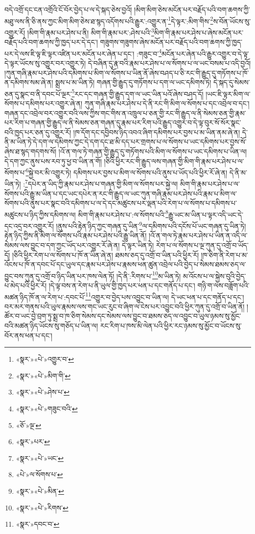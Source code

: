 བདེ་འགྲོ་དང་ངན་འགྲོའི་ངོ་བོར་བྱེད་པ་ལ་དེ་སྐད་ཅེས་བྱའོ། །མིག་མིག་ཅེས་མངོན་པར་བརྗོད་པའི་བག་ཆགས་ཀྱི་མཐུ་ལས་ནི་ཅི་ནས་ཀྱང་མིག་མིག་ཅེས་ཐ་སྙད་འདོགས་པའི་རྒྱུར་:འགྱུར་ན་\footnote{«སྣར་»«པེ་»འགྱུར་བ་}དེ་ལྟར་:མིག་གིས་\footnote{«སྣར་»«པེ་»མིག་གི་}ས་བོན་ཡོངས་སུ་འགྱུར་རོ། །མིག་གི་རྣམ་པར་ཤེས་པ་ནི། མིག་གི་རྣམ་པར་:ཤེས་པའི་\footnote{«སྣར་»«པེ་»ཤེས་པ་}མིག་གི་རྣམ་པར་ཤེས་པ་ཞེས་མངོན་པར་བརྗོད་པའི་བག་ཆགས་ཀྱི་ཁྱད་པར་དེ་དང་། གཟུགས་གཟུགས་ཞེས་མངོན་པར་བརྗོད་པའི་བག་ཆགས་ཀྱི་ཁྱད་པར་དེ་ལས་ཇི་ལྟ་ཇི་ལྟར་འཛིན་པར་མངོན་པར་ཞེན་པ་དང་། :གཟུང་བ་\footnote{«སྣར་»«པེ་»གཟུང་བའི་}མངོན་པར་ཞེན་པའི་རྒྱུར་འགྱུར་བ་དེ་ལྟ་དེ་ལྟར་ཡོངས་སུ་འགྱུར་བར་འགྱུར་ཏེ། དེ་བཞིན་དུ་རྣ་བའི་རྣམ་པར་ཤེས་པ་ལ་སོགས་པ་ལ་ཡང་བསམ་པ་འདི་བྱའོ། །ཀུན་གཞི་རྣམ་པར་ཤེས་པའི་དམིགས་པ་མིག་ལ་སོགས་པ་ཡིན་ནོ་ཞེས་བཤད་པ་ཅི་རང་གི་རྒྱུད་དུ་གཏོགས་པ་ཁོ་ན་དམིགས་སམ་ཞེ་ན། སྨྲས་པ་མ་ཡིན་ཏེ། གཞན་གྱི་རྒྱུད་དུ་གཏོགས་པ་དག་ལ་ཡང་དམིགས་ཏེ། དེ་སྐད་དུ་སེམས་ཅན་དུ་སྣང་བ་ནི་དབང་པོ་ལྔར་\footnote{«ཅོ་»ལྔ་}རང་དང་གཞན་གྱི་རྒྱུད་དག་ལ་ཡང་ཡིན་པའོ་ཞེས་བཤད་དོ། །ཡང་ཇི་ལྟར་མིག་ལ་སོགས་པ་དམིགས་པར་འགྱུར་ཞེ་ན། ཀུན་གཞི་རྣམ་པར་ཤེས་པ་དེ་ནི་རང་གི་མིག་ལ་སོགས་པ་དང་འབྲེལ་བ་དང་། གཞན་དང་འབྲེལ་བར་འགྱུར་བའི་ལས་ཀྱིས་གང་གིས་ན་འཁྲུལ་པ་ཅན་གྱི་རང་གི་རྒྱུད་ལ་ནི་སེམས་ཅན་གྱི་རྣམ་པར་རིག་པ་གཞན་གྱི་རྒྱུད་ལ་ནི་སེམས་ཅན་གཞན་དུ་རྣམ་པར་རིག་པའི་རྒྱུད་འགྱུར་བ་དེ་ལྟ་བུར་སོ་སོར་སྣང་བའི་ཁྱད་པར་ཅན་དུ་འགྱུར་རོ། །ཁ་དོག་དང་དབྱིབས་ཉིད་འབའ་ཞིག་དམིགས་པར་བྱས་པ་མ་ཡིན་ནམ་ཞེ་ན། དེ་ནི་མ་ཡིན་ཏེ་དེ་དག་ལ་དམིགས་ཀྱང་དེ་དག་དང་ཐ་མི་དད་པར་གྲགས་པ་ལ་སོགས་པ་ཡང་དམིགས་པར་བྱས་སོ་ཞེས་ཐ་སྙད་གདགས་སོ། །འོ་ན་གལ་ཏེ་གཞན་གྱི་རྒྱུད་དུ་གཏོགས་པའི་མིག་ལ་སོགས་པ་ཡང་དམིགས་པ་ཡིན་ལ། དེ་དག་ཀྱང་ནུས་པས་རབ་ཏུ་ཕྱ་བ་ཡིན་ན་གོ། །ཅིའི་ཕྱིར་རང་གི་རྒྱུད་ལས་གཞན་གྱི་མིག་གི་རྣམ་པར་ཤེས་པ་ལ་སོགས་པ་\footnote{«སྣར་»པར་}སྐྱེ་བར་མི་འགྱུར་ཏེ། དམིགས་པར་བྱས་པ་མིག་ལ་སོགས་པའི་ནུས་པ་ཡོད་པའི་ཕྱིར་རོ་ཞེ་ན། དེ་ནི་མ་ཡིན་ཏེ། :\footnote{«སྣར་»«པེ་»ཡང་}དཔེར་ན་ཡིད་ཀྱི་རྣམ་པར་ཤེས་པ་གཞན་གྱི་མིག་ལ་སོགས་པར་སྐྱེ་ལ། མིག་གི་རྣམ་པར་ཤེས་པ་ལ་སོགས་པའི་རྒྱུ་མ་ཡིན་པ་དང་ཡང་དཔེར་ན་རང་གི་རྒྱུད་ལ་ཡང་ཀུན་གཞི་རྣམ་པར་ཤེས་པའི་རྣམ་པ་མིག་ལ་སོགས་པའི་ནུས་པར་སྣང་བའི་དམིགས་པ་ལ་དེ་དང་མཚུངས་པར་ལྡན་པའི་རེག་པ་ལ་སོགས་པ་དམིགས་པ་མཚུངས་པ་ཉིད་ཀྱིས་དམིགས་ལ། མིག་གི་རྣམ་པར་ཤེས་པ་:ལ་སོགས་པའི་\footnote{«པེ་»ལ་སོགས་པ་}རྒྱུ་ཡང་མ་ཡིན་པ་ལྟར་འདི་ཡང་དེ་དང་འདྲ་བར་འགྱུར་རོ། །ནུས་པའི་རྟེན་ཉིད་ཀྱང་གཞན་དུ་ཡིན་\footnote{«སྣར་»«པེ་»མིན་}ལ་དམིགས་པའི་དངོས་པོ་ཡང་གཞན་དུ་ཡིན་ཏེ། རྟེན་ཉིད་ཀྱིས་ནི་མིག་ལ་སོགས་པའི་རྣམ་པར་ཤེས་པའི་རྒྱུ་ཡིན་ནོ། །འོ་ན་གལ་ཏེ་རྣམ་པར་ཤེས་པ་ཡིན་ན་འདི་ལ་སེམས་ལས་བྱུང་བ་དག་ཀྱང་ཡོད་པར་འགྱུར་རོ་ཞེ་ན། དེ་ལྟར་ཡིན་ཏེ། རེག་པ་ལ་སོགས་པ་ལྔ་ཀུན་དུ་འགྲོ་བ་ཡོད་དོ། །ཅིའི་ཕྱིར་རེག་པ་ལ་སོགས་པ་ཁོ་ན་ཡིན་ཞེ་ན། ཐམས་ཅད་དུ་འགྲོ་བ་ཡིན་པའི་ཕྱིར་རོ། །ཁ་ཅིག་ནི་རེག་པ་མ་འོངས་པ་ཁོ་ན་དབང་པོ་དང་ཡུལ་དང་རྣམ་པར་ཤེས་པ་རྣམས་ཕན་ཚུན་འབྲེལ་པའི་བྱེད་པ་སེམས་ཐམས་ཅད་ལ་བྱུང་བས་ཀུན་དུ་འགྲོ་བ་ཉིད་ཡིན་པར་ཁས་ལེན་ཏོ། །དེ་ནི་:རིགས་པ་\footnote{«སྣར་»«པེ་»རིགས་}མ་ཡིན་ཏེ། མ་འོངས་པ་ལ་སྐྱེས་བུའི་བྱེད་པ་མེད་པའི་ཕྱིར་རོ། །དེ་ལྟ་བས་ན་རེག་པ་ནི་ཡུལ་གྱི་ཁྱད་པར་ཕན་པ་དང་གནོད་པ་དང་། གཉི་ག་ལས་བཟློག་པའི་མཚན་ཉིད་ཁོ་ན་ལ་རེག་པ་:དབང་པོ་\footnote{«སྣར་»དབང་བ་}འགྱུར་བ་བྱེད་པས་འབྱུང་བ་ཡིན་ལ། དེ་ཡང་ཕན་པ་དང་གནོད་པ་དང་། བར་མར་གནས་པའི་ཡུལ་རྣམས་ལས་གང་ཡང་རུང་བ་ཞིག་ལ་ངེས་པར་འབྱུང་བའི་ཕྱིར་ཀུན་དུ་འགྲོ་བ་ཡིན་ནོ། །ཚོར་བ་ཡང་བྱེ་བྲག་ཏུ་སྨྲ་བ་ཁ་ཅིག་སེམས་དང་སེམས་ལས་བྱུང་བ་ཐམས་ཅད་ལ་འབྱུང་བ་ཡུལ་ཉམས་སུ་མྱོང་བའི་མཚན་ཉིད་ཡོངས་སུ་གཅོད་པ་ཡིན་ལ། རང་རིག་པ་ཁས་མི་ལེན་པའི་ཕྱིར་རང་ཉམས་སུ་མྱོང་བ་ཡོངས་སུ་བོར་ནས་ཕན་པ་དང་། 